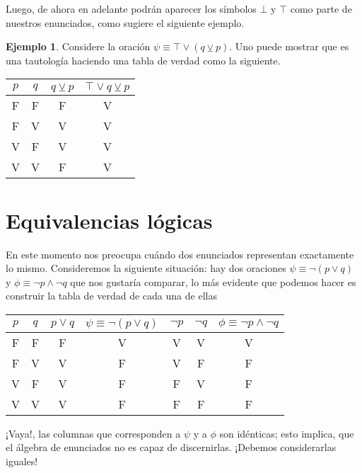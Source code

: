 \documentclass{book}
\theoremstyle{definition}
\newtheorem{ejm}{Ejemplo}[chapter]
\begin{document}
Luego, de ahora en adelante podrán aparecer los símbolos $\bot$ y $\top$ como parte de nuestros enunciados, como sugiere el siguiente ejemplo.

\begin{ejm}
	Considere la oración $\psi \equiv \top \vee (q \veebar p)$. Uno puede mostrar que es una tautología haciendo una tabla de verdad como la siguiente.
	\begin{center}\begin{tabular}{|c|c||c|c|}
		\hline
		$p$ & $q$ & $q\veebar p$ & $\top \vee q\veebar p$ \\
		\hline\hline
		F & F & F & V \\ \hline
		F & V & V & V \\ \hline
		V & F & V & V \\ \hline
		V & V & F & V \\ \hline
	\end{tabular}\end{center}
\end{ejm}

\section{Equivalencias lógicas}
En este momento nos preocupa cuándo dos enunciados representan exactamente lo mismo.
Consideremos la siguiente situación: hay dos oraciones $\psi \equiv \neg (p \vee q)$ y $\phi \equiv \neg p \wedge \neg q$ que nos gustaría comparar, lo más evidente que podemos hacer es construir la tabla de verdad de cada una de ellas
\begin{center}\begin{tabular}{|c|c||c|c|c|c|c|}
	\hline
	$p$ & $q$ & $p\vee q$ & $\psi \equiv \neg (p \vee q)$ & $\neg p$ & $\neg q$ & $\phi \equiv \neg p \wedge \neg q$ \\
	\hline\hline
	F & F & F & V & V & V & V \\ \hline
	F & V & V & F & V & F & F \\ \hline
	V & F & V & F & F & V & F \\ \hline
	V & V & V & F & F & F & F \\ \hline
\end{tabular}\end{center}
¡Vaya!, las columnas que corresponden a $\psi$ y a $\phi$ son idénticas; esto implica, que el álgebra de enunciados no es capaz de discernirlas. ¡Debemos considerarlas iguales!
\end{document}
